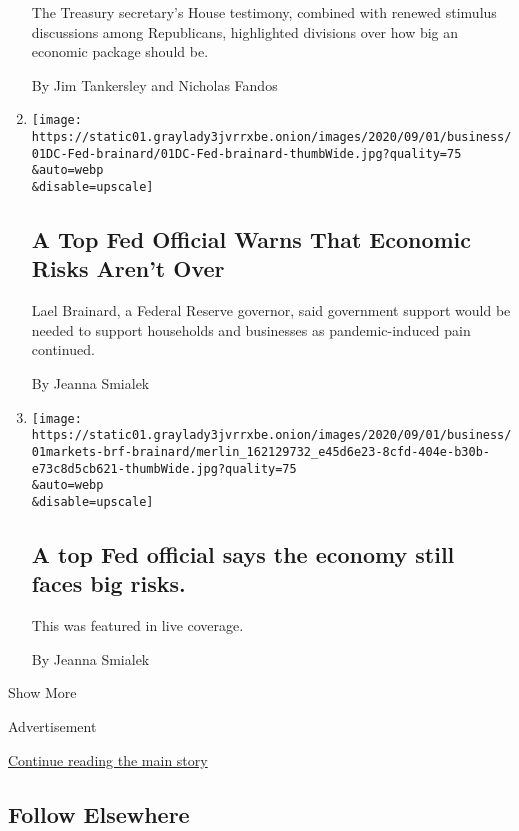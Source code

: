 \begin{enumerate}
  The Treasury secretary's House testimony, combined with renewed
  stimulus discussions among Republicans, highlighted divisions over how
  big an economic package should be.

  By Jim Tankersley and Nicholas Fandos
\item
  \href{/2020/09/01/business/economy/fed-economic-risks-brainard.html}{}

  \texttt{[image: https://static01.graylady3jvrrxbe.onion/images/2020/09/01/business/01DC-Fed-brainard/01DC-Fed-brainard-thumbWide.jpg?quality=75\\\&auto=webp\\\&disable=upscale]}

  \hypertarget{a-top-fed-official-warns-that-economic-risks-arent-over}{%
  \subsection{A Top Fed Official Warns That Economic Risks Aren't
  Over}\label{a-top-fed-official-warns-that-economic-risks-arent-over}}

  Lael Brainard, a Federal Reserve governor, said government support
  would be needed to support households and businesses as
  pandemic-induced pain continued.

  By Jeanna Smialek
\item
  \href{/live/2020/09/01/business/stock-market-today-coronavirus/a-top-fed-official-says-the-economy-still-faces-big-risks}{}

  \texttt{[image: https://static01.graylady3jvrrxbe.onion/images/2020/09/01/business/01markets-brf-brainard/merlin\_162129732\_e45d6e23-8cfd-404e-b30b-e73c8d5cb621-thumbWide.jpg?quality=75\\\&auto=webp\\\&disable=upscale]}

  \hypertarget{a-top-fed-official-says-the-economy-still-faces-big-risks}{%
  \subsection{A top Fed official says the economy still faces big
  risks.}\label{a-top-fed-official-says-the-economy-still-faces-big-risks}}

  This was featured in live coverage.

  By Jeanna Smialek
\end{enumerate}

Show More

Advertisement

\protect\hyperlink{after-mid2}{Continue reading the main story}

\hypertarget{follow-elsewhere}{%
\subsection{Follow Elsewhere}\label{follow-elsewhere}}

